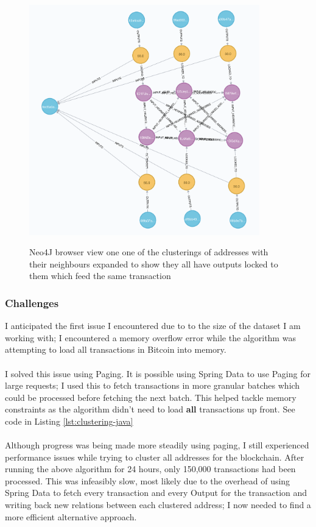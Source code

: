 \begin{figure}[h!]
  \centering
  \includegraphics[width = 10cm]{./figures/input-one-tx-heuristic-1}\\[0.5cm] 
  \caption{Neo4J browser view one one of the clusterings of addresses with their neighbours expanded to show they all have outputs locked to them which feed the same transaction}
  \label{fig:neo4j-1-tx-heuristic-1-cluster}
\end{figure}


\subsubsection{Challenges}

I anticipated the first issue I encountered due to to the size of the dataset I am working with; I encountered a memory overflow error while the algorithm was attempting to load all transactions in Bitcoin into memory. 
\\\\
I solved this issue using Paging. It is possible using Spring Data to use Paging for large requests; I used this to fetch transactions in more granular batches which could be processed before fetching the next batch. This helped tackle memory constraints as the algorithm didn't need to load \textbf{all} transactions up front. See code in Listing \ref{lst:clustering-java}
\\\\
Although progress was being made more steadily using paging, I still experienced performance issues while trying to cluster all addresses for the blockchain. After running the above algorithm for 24 hours, only 150,000 transactions had been processed. This was infeasibly slow, most likely due to the overhead of using Spring Data to fetch every transaction and every Output for the transaction and writing back new relations between each clustered address; I now needed to find a more efficient alternative approach. 
\\\\

